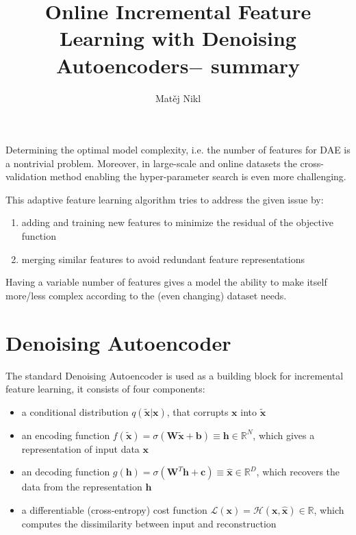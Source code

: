 \documentclass[a4paper,twocolumn]{article}
\title{Online Incremental Feature Learning with Denoising Autoencoders$-$ summary}
\author{Matěj Nikl}
\begin{document}
\maketitle
Determining the optimal model complexity, i.e. the number of features for DAE is a nontrivial problem. Moreover, in large-scale and online datasets the cross-validation method enabling the hyper-parameter search is even more challenging.

This adaptive feature learning algorithm tries to address the given issue by:
\begin{enumerate}
    \item adding and training new features to minimize the residual of the objective function
    \item merging similar features to avoid redundant feature representations
\end{enumerate}
Having a variable number of features gives a model the ability to make itself more/less complex according to the (even changing) dataset needs.

\section{Denoising Autoencoder}
The standard Denoising Autoencoder is used as a building block for incremental feature learning, it consists of four components:
\begin{itemize}
    \item a conditional distribution $q(\mathbf{\widetilde{x}|x})$, that corrupts $\mathbf{x}$ into $\mathbf{\widetilde{x}}$
    \item an encoding function $f(\mathbf{\widetilde{x}}) = \sigma(\mathbf{W\widetilde{x} + b}) \equiv \mathbf{h} \in \mathbb{R}^N$, which gives a representation of input data $\mathbf{x}$
    \item an decoding function $g(\mathbf{h}) = \sigma(\mathbf{W}^T\mathbf{h + c}) \equiv \mathbf{\widehat{x}} \in \mathbb{R}^D$, which recovers the data from the representation $\mathbf{h}$
    \item a differentiable (cross-entropy) cost function $\mathcal{L}(\mathbf{x}) = \mathcal{H}(\mathbf{x}, \mathbf{\widehat{x}}) \in \mathbb{R}$, which computes the dissimilarity between input and reconstruction
\end{itemize}
\end{document}
